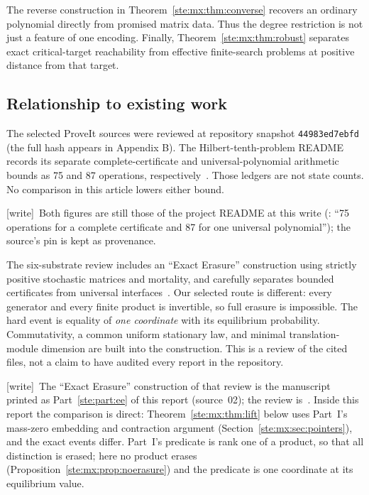 \documentclass[11pt,letterpaper]{article}
\theoremstyle{definition}
\theoremstyle{remark}
\newcommand{\wtag}{\textup{[write]}}
\begin{document}
The reverse construction in Theorem~\ref{ste:mx:thm:converse} recovers an ordinary
polynomial directly from promised matrix data. Thus the degree restriction is
not just a feature of one encoding. Finally, Theorem~\ref{ste:mx:thm:robust} separates
exact critical-target reachability from effective finite-search problems at
positive distance from that target.

\subsection{Relationship to existing work}

The selected ProveIt sources were reviewed at repository snapshot
\texttt{44983ed7ebfd} (the full hash appears in Appendix B). The
Hilbert-tenth-problem README records its separate complete-certificate and universal-polynomial
arithmetic bounds as 75 and 87 operations, respectively~\cite{repoH10}.
Those ledgers are not state counts. No comparison in this article lowers either
bound.

\wtag\ Both figures are still those of the project README at this write (: ``75 operations for a complete certificate and 87 for one universal polynomial''); the source's pin is kept as provenance.

The six-substrate review includes an ``Exact Erasure'' construction using
strictly positive stochastic matrices and mortality, and carefully separates
bounded certificates from universal interfaces~\cite{review1977}. Our selected
route is different: every generator and every finite product is invertible, so
full erasure is impossible. The hard event is equality of \emph{one coordinate}
with its equilibrium probability. Commutativity, a common uniform stationary
law, and minimal translation-module dimension are built into the construction.
This is a review of the cited files, not a claim to have audited every report in
the repository.

\wtag\ The ``Exact Erasure'' construction of that review is the manuscript printed as Part~\ref{ste:part:ee} of this report (source~02); the review is~\cite{review1977}. Inside this report the comparison is direct: Theorem~\ref{ste:mx:thm:lift} below uses Part~I's mass-zero embedding and contraction argument (Section~\ref{ste:mx:sec:pointers}), and the exact events differ. Part~I's predicate is rank one of a product, so that all distinction is erased; here no product erases (Proposition~\ref{ste:mx:prop:noerasure}) and the predicate is one coordinate at its equilibrium value.
\end{document}
